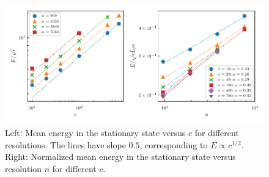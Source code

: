 \begin{figure}
\centerline{\includegraphics[width=5.8in]{../Pyfig/fig_energy_w}}
\caption{Left: Mean energy in the stationary state versus $ c $ for different resolutions. The lines have slope $ 0.5 $, corresponding to $ E \propto c^{1/2} $. Right: Normalized mean energy in the stationary state versus resolution $ n $ for different $ c $.}
\label{MeanE}
\end{figure}



